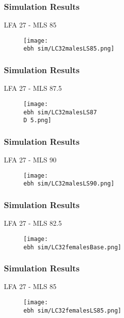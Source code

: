 \documentclass{beamer}
\newcommand{\ebh}{\string~/bio.data/bio.lobster/figures/LFA2733Framework2018/} %
\newcommand{\D}{.}
\begin{document}
\begin{frame}
\frametitle{Simulation Results}
LFA 27 - MLS 85
\begin{figure}
        \begin{center}
            \texttt{[image: \\ebh sim/LC32malesLS85.png]}
        \end{center}
    \end{figure}
\end{frame}


\begin{frame}
\frametitle{Simulation Results}
LFA 27 - MLS 87.5
\begin{figure}
        \begin{center}
            \texttt{[image: \\ebh sim/LC32malesLS87\\D 5.png]}
        \end{center}
    \end{figure}
\end{frame}


\begin{frame}
\frametitle{Simulation Results}
LFA 27 - MLS 90
\begin{figure}
        \begin{center}
            \texttt{[image: \\ebh sim/LC32malesLS90.png]}
        \end{center}
    \end{figure}
\end{frame}




\begin{frame}
\frametitle{Simulation Results}
LFA 27 - MLS 82.5
\begin{figure}
        \begin{center}
            \texttt{[image: \\ebh sim/LC32femalesBase.png]}
        \end{center}
    \end{figure}
\end{frame}



\begin{frame}
\frametitle{Simulation Results}
LFA 27 - MLS 85
\begin{figure}
        \begin{center}
            \texttt{[image: \\ebh sim/LC32femalesLS85.png]}
        \end{center}
    \end{figure}
\end{frame}
\end{document}
